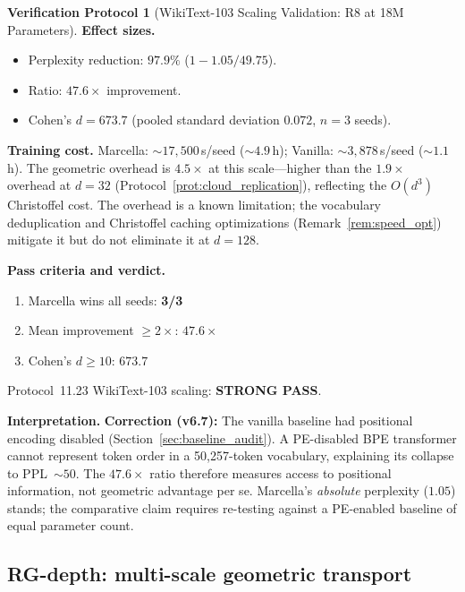 \documentclass[11pt,a4paper]{article}
\theoremstyle{definition}
\newtheorem{protocol}[theorem]{Verification Protocol}
\theoremstyle{remark}
\begin{document}
\begin{protocol}[WikiText-103 Scaling Validation: R8 at 18M 
Parameters]
\textbf{Effect sizes.}
\begin{itemize}[nosep]
  \item Perplexity reduction: $\mathbf{97.9\%}$ 
  ($1 - 1.05/49.75$).
  \item Ratio: $47.6\times$ improvement.
  \item Cohen's $d = 673.7$ (pooled standard deviation 
  $0.072$, $n = 3$ seeds).
\end{itemize}

\textbf{Training cost.} Marcella: ${\sim}17{,}500$\,s/seed 
(${\sim}4.9$\,h); Vanilla: ${\sim}3{,}878$\,s/seed 
(${\sim}1.1$\,h). The geometric overhead is $4.5\times$ at this 
scale---higher than the $1.9\times$ overhead at $d = 32$ 
(Protocol~\ref{prot:cloud_replication}), reflecting the 
$O(d^3)$ Christoffel cost. The overhead is a known limitation; 
the vocabulary deduplication and Christoffel caching optimizations 
(Remark~\ref{rem:speed_opt}) mitigate it but do not eliminate it 
at $d = 128$.

\medskip
\textbf{Pass criteria and verdict.}
\begin{enumerate}[nosep]
  \item Marcella wins all seeds: \textbf{3/3}~\checkmark
  \item Mean improvement $\geq 2\times$: 
  \textbf{$47.6\times$}~\checkmark
  \item Cohen's $d \geq 10$: \textbf{$673.7$}~\checkmark
\end{enumerate}
Protocol~11.23 WikiText-103 scaling: \textbf{STRONG PASS}.

\medskip
\textbf{Interpretation.} \textbf{Correction (v6.7):} The 
vanilla baseline had positional encoding disabled 
(Section~\ref{sec:baseline_audit}). A PE-disabled BPE 
transformer cannot represent token order in a 50{,}257-token 
vocabulary, explaining its collapse to PPL~$\sim\!50$. The 
$47.6\times$ ratio therefore measures access to positional 
information, not geometric advantage per se. Marcella's 
\emph{absolute} perplexity ($1.05$) stands; the comparative 
claim requires re-testing against a PE-enabled baseline of equal 
parameter count.
\end{protocol}


\subsection{RG-depth: multi-scale geometric 
transport}\label{sec:rg_depth}
\end{document}
